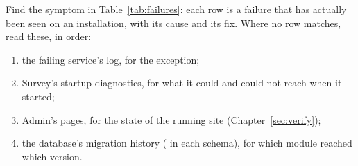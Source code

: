 \documentclass[11pt, a4paper]{article}
\begin{document}
Find the symptom in Table~\ref{tab:failures}: each row is a failure that has actually been seen
on an installation, with its cause and its fix. Where no row matches, read these, in order:
\begin{enumerate}
  \item the failing service's log, for the exception;
  \item Survey's startup diagnostics, for what it could and could not reach when it started;
  \item Admin's  pages, for the state of the running site
        (Chapter~\ref{sec:verify});
  \item the database's migration history ( in each schema), for
        which module reached which version.
\end{enumerate}
\end{document}
